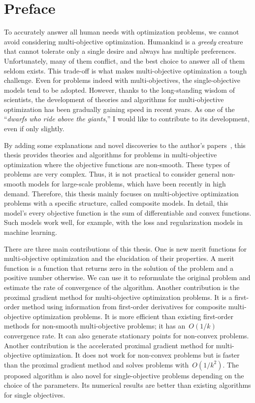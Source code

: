 \documentclass[../main]{subfiles}
\begin{document}
\chapter*{Preface}
To accurately answer all human needs with optimization problems, we cannot avoid considering multi-objective optimization.
Humankind is a \emph{greedy} creature that cannot tolerate only a single desire and always has multiple preferences.
Unfortunately, many of them conflict, and the best choice to answer all of them seldom exists. This trade-off is what makes multi-objective optimization a tough challenge.
Even for problems indeed with multi-objectives, the single-objective models tend to be adopted.
However, thanks to the long-standing wisdom of scientists, the development of theories and algorithms for multi-objective optimization has been gradually gaining speed in recent years.
As one of the ``\emph{dwarfs who ride above the giants},'' I would like to contribute to its development, even if only slightly.

By adding some explanations and novel discoveries to the author's papers~\cite{Tanabe2019,Tanabe2022,Tanabe2022a,Tanabe2022b,Tanabe2022c}, this thesis provides theories and algorithms for problems in multi-objective optimization where the objective functions are non-smooth.
These types of problems are very complex.
Thus, it is not practical to consider general non-smooth models for large-scale problems, which have been recently in high demand.
Therefore, this thesis mainly focuses on multi-objective optimization problems with a specific structure, called composite models.
In detail, this model's every objective function is the sum of differentiable and convex functions.
Such models work well, for example, with the loss and regularization models in machine learning.

There are three main contributions of this thesis.
One is new merit functions for multi-objective optimization and the elucidation of their properties.
A merit function is a function that returns zero in the solution of the problem and a positive number otherwise.
We can use it to reformulate the original problem and estimate the rate of convergence of the algorithm.
Another contribution is the proximal gradient method for multi-objective optimization problems.
It is a first-order method using information from first-order derivatives for composite multi-objective optimization problems.
It is more efficient than existing first-order methods for non-smooth multi-objective problems; it has an~$O(1/k)$ convergence rate.
It can also generate stationary points for non-convex problems. Another contribution is the accelerated proximal gradient method for multi-objective optimization.
It does not work for non-convex problems but is faster than the proximal gradient method and solves problems with~$O(1/k^2)$.
The proposed algorithm is also novel for single-objective problems depending on the choice of the parameters.
Its numerical results are better than existing algorithms for single objectives.

\begin{flushright}
    \TheAuthor \\
    \TheDate
\end{flushright}
\end{document}
